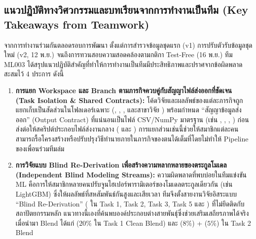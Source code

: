 \subsection{แนวปฏิบัติทางวิศวกรรมและบทเรียนจากการทำงานเป็นทีม (Key Takeaways from Teamwork)}
\label{subsec:team_takeaways}

จากการทำงานร่วมกันตลอดรอบการพัฒนา ตั้งแต่การสำรวจข้อมูลชุดแรก (v1) การปรับตัวรับข้อมูลชุดใหม่ (v2, 12 พ.ย.) จนถึงการทวนสอบความสอดคล้องตามกติกา Test-Free (16 พ.ย.) ทีม ML003 ได้สรุปแนวปฏิบัติสำคัญที่ทำให้การทำงานเป็นทีมมีประสิทธิภาพและปราศจากข้อผิดพลาดสะสมไว้ 4 ประการ ดังนี้

\begin{enumerate}
  \item \textbf{การแยก Workspace และ Branch ตามภารกิจควบคู่กับสัญญาไฟล์ส่งออกที่ชัดเจน (Task Isolation \& Shared Contracts):}
  โค้ดวิจัยและผลลัพธ์ของแต่ละภารกิจถูกแยกเก็บเป็นสัดส่วนในโฟลเดอร์เฉพาะ (, , ,  และสาขาวิจัย ) พร้อมกำหนด ``สัญญาข้อมูลส่งออก'' (Output Contract) ที่แน่นอนเป็นไฟล์ CSV/NumPy มาตรฐาน (เช่น , , , ) ก่อนส่งต่อให้สคริปต์ประกอบไฟล์ส่งงานกลาง ( และ ) การแยกส่วนเช่นนี้ช่วยให้สมาชิกแต่ละคนสามารถรื้อโครงสร้างหรือปรับปรุงวิธีทำนายภายในภารกิจของตนได้เต็มที่โดยไม่ทำให้ Pipeline ของเพื่อนร่วมทีมล่ม

  \item \textbf{การวิจัยแบบ Blind Re-Derivation เพื่อสร้างความหลากหลายของตระกูลโมเดล (Independent Blind Modeling Streams):}
  ความผิดพลาดที่พบบ่อยในทีมแข่งขัน ML คือการให้สมาชิกหลายคนปรับจูนไฮเปอร์พารามิเตอร์ของโมเดลตระกูลเดียวกัน (เช่น LightGBM) ซึ่งให้ผลลัพธ์ที่สหสัมพันธ์กันสูงและเสียเวลา ทีมจึงตั้งสายงานวิจัยอิสระแบบ ``Blind Re-Derivation'' ( ใน Task 1, Task 2, Task 3, Task 5 และ ) ที่ไม่ยึดติดกับสถาปัตยกรรมหลัก แนวทางนี้เองที่ค้นพบองค์ประกอบต่างสายพันธุ์ซึ่งช่วยเสริมเสถียรภาพได้จริงเมื่อนำมา Blend ได้แก่  ($20\%$ ใน Task 1 Clean Blend) และ  ($8\%$) +  ($5\%$) ใน Task 2 Blend


\end{enumerate}
